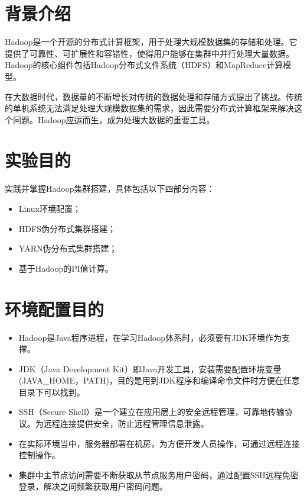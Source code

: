 \documentclass {article}
\begin{document}
	\maketitle{}
	\section{背景介绍}
		Hadoop是一个开源的分布式计算框架，用于处理大规模数据集的存储和处理。它提供了可靠性、可扩展性和容错性，使得用户能够在集群中并行处理大量数据。Hadoop的核心组件包括Hadoop分布式文件系统（HDFS）和MapReduce计算模型。
		
		在大数据时代，数据量的不断增长对传统的数据处理和存储方式提出了挑战。传统的单机系统无法满足处理大规模数据集的需求，因此需要分布式计算框架来解决这个问题。Hadoop应运而生，成为处理大数据的重要工具。
		
	\section{实验目的}
		实践并掌握Hadoop集群搭建，具体包括以下四部分内容：
		\begin{itemize}
			\item Linux环境配置；
			\item HDFS伪分布式集群搭建；
			\item YARN伪分布式集群搭建；
			\item 基于Hadoop的PI值计算。
		\end{itemize}
	
	\section{环境配置目的}
		\begin{itemize}
			\item Hadoop是Java程序进程，在学习Hadoop体系时，必须要有JDK环境作为支撑。
			\item JDK（Java Development Kit）即Java开发工具，安装需要配置环境变量(JAVA\_HOME，PATH)，目的是用到JDK程序和编译命令文件时方便在任意目录下可以找到。
			\item SSH（Secure Shell）是一个建立在应用层上的安全远程管理，可靠地传输协议。为远程连接提供安全，防止远程管理信息泄露。
			\item 在实际环境当中，服务器部署在机房，为方便开发人员操作，可通过远程连接控制操作。
			\item 集群中主节点访问需要不断获取从节点服务用户密码，通过配置SSH远程免密登录，解决之间频繁获取用户密码问题。
		\end{itemize}
	
\end{document}
